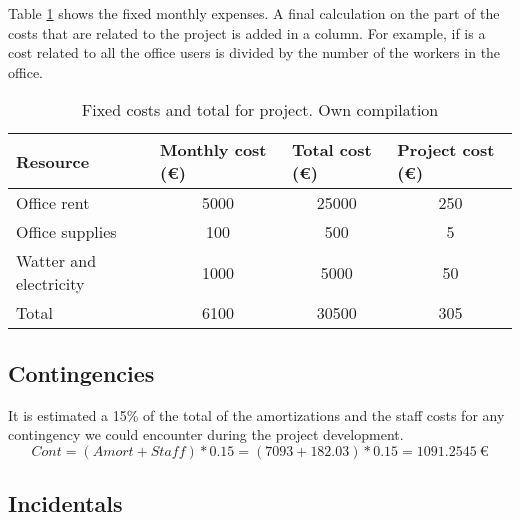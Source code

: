 Table \ref{tab:fix} shows the fixed monthly expenses. A final calculation on the part of the costs that are related to the project is added in a column. For example, if is a cost related to all the office users is divided by the number of the workers in the office.
\begin{table}[htbp!]
\centering
\begin{tabular}{|l|c|c|c|}
\hline
Resource               & \multicolumn{1}{l|}{Monthly cost (\euro)} & \multicolumn{1}{l|}{Total cost (\euro)} & \multicolumn{1}{l|}{Project cost (\euro)} \\ \hline
Office rent            & 5000                              & 25000                           & 250                               \\ \hline
Office supplies        & 100                               & 500                             & 5                                 \\ \hline
Watter and electricity & 1000                              & 5000                            & 50                                \\ \hline
Total                  & 6100                              & 30500                           & 305                               \\ \hline
\end{tabular}
\caption[Fixed costs and total for project.]{Fixed costs and total for project. Own compilation}
\label{tab:fix}
\end{table}

\subsection{Contingencies}

It is estimated a 15\% of the total of the amortizations and the staff costs for any contingency we could encounter during the project development.
\begin{equation*}
  Cont=(Amort+Staff)*0.15=(7093+182.03)*0.15=1091.2545\ \euro
\end{equation*}

\subsection{Incidentals}

